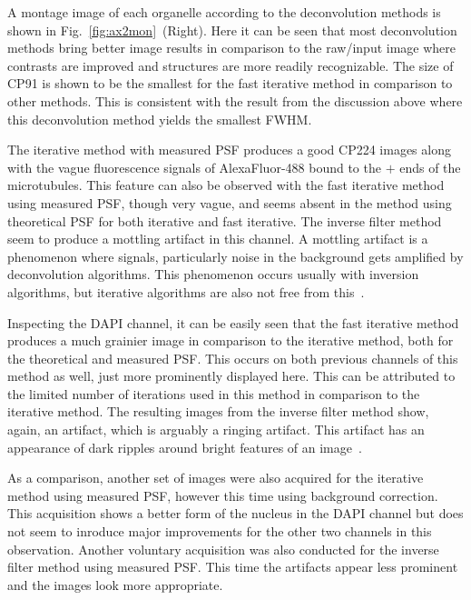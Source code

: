 A montage image of each organelle according to the deconvolution methods is shown in Fig.~\ref{fig:ax2mon}~(Right). 
Here it can be seen that most deconvolution methods bring better image results in comparison to the raw/input image where contrasts are improved and structures are more readily recognizable. 
The size of CP91 is shown to be the smallest for the fast iterative method in comparison to other methods. 
This is consistent with the result from the discussion above where this deconvolution method yields the smallest FWHM. 

The iterative method with measured PSF produces a good CP224 images along with the vague fluorescence signals of AlexaFluor-488 bound to the $+$ ends of the microtubules. 
This feature can also be observed with the fast iterative method using measured PSF, though very vague, and seems absent in the method using theoretical PSF for both iterative and fast iterative. 
The inverse filter method seem to produce a mottling artifact in this channel. 
A mottling artifact is a phenomenon where signals, particularly noise in the background gets amplified by deconvolution algorithms. 
This phenomenon occurs usually with inversion algorithms, but iterative algorithms are also not free from this~\cite{DecArtif}. 

Inspecting the DAPI channel, it can be easily seen that the fast iterative method produces a much grainier image in comparison to the iterative method, both for the theoretical and measured PSF. 
This occurs on both previous channels of this method as well, just more prominently displayed here. 
This can be attributed to the limited number of iterations used in this method in comparison to the iterative method. 
The resulting images from the inverse filter method show, again, an artifact, which is arguably a ringing artifact. This artifact has an appearance of dark ripples around bright features of an image~\cite{DecArtif}.  

As a comparison, another set of images were also acquired for the iterative method using measured PSF, however this time using background correction. 
This acquisition shows a better form of the nucleus in the DAPI channel but does not seem to inroduce major improvements for the other two channels in this observation. 
Another voluntary acquisition was also conducted for the inverse filter method using measured PSF. 
This time the artifacts appear less prominent and the images look more appropriate.

